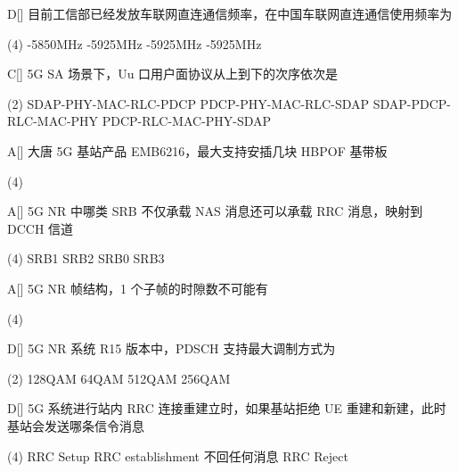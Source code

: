 \begin{choice}{D}[]
    目前工信部已经发放车联网直连通信频率，在中国车联网直连通信使用频率为
    \begin{tasks}(4)
        -5850MHz
        -5925MHz
        -5925MHz
        -5925MHz
    \end{tasks}
\end{choice}


\begin{choice}{C}[]
    5G SA 场景下，Uu 口用户面协议从上到下的次序依次是
    \begin{tasks}(2)
        \task SDAP-PHY-MAC-RLC-PDCP
        \task PDCP-PHY-MAC-RLC-SDAP
        \task SDAP-PDCP-RLC-MAC-PHY
        \task  PDCP-RLC-MAC-PHY-SDAP
    \end{tasks}
\end{choice}


\begin{choice}{A}[]
    大唐 5G 基站产品 EMB6216，最大支持安插几块 HBPOF 基带板
    \begin{tasks}(4)
    \end{tasks}
\end{choice}


\begin{choice}{A}[]
    5G NR 中哪类 SRB 不仅承载 NAS 消息还可以承载 RRC 消息，映射到 DCCH 信道
    \begin{tasks}(4)
        \task SRB1
        \task  SRB2
        \task SRB0
        \task SRB3
    \end{tasks}
\end{choice}

\begin{choice}{A}[]
    5G NR 帧结构，1 个子帧的时隙数不可能有
    \begin{tasks}(4)
    \end{tasks}
\end{choice}

\begin{choice}{D}[]
    5G NR 系统 R15 版本中，PDSCH 支持最大调制方式为
    \begin{tasks}(2)
        \task 128QAM
        \task 64QAM
        \task 512QAM
        \task 256QAM
    \end{tasks}
\end{choice}



\begin{choice}{D}[]
    5G 系统进行站内 RRC 连接重建立时，如果基站拒绝 UE 重建和新建，此时基站会发送哪条信令消息
    \begin{tasks}(4)
        \task  RRC Setup
        \task RRC establishment
        \task 不回任何消息
        \task RRC Reject
    \end{tasks}
\end{choice}


